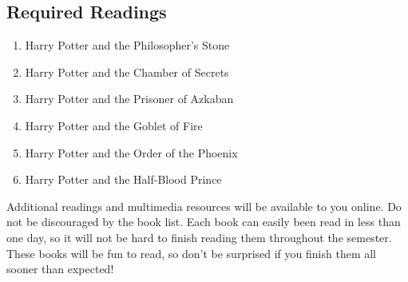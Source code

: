 \documentclass{article}
\begin{document}
\subsection {Required Readings}

\begin{enumerate}
\item Harry Potter and the Philosopher’s Stone
\item Harry Potter and the Chamber of Secrets
\item Harry Potter and the Prisoner of Azkaban
\item Harry Potter and the Goblet of Fire
\item Harry Potter and the Order of the Phoenix
\item Harry Potter and the Half-Blood Prince
\end{enumerate}

Additional readings and multimedia resources will be available to you online.
Do not be discouraged by the book list. Each book can easily been read in less than one day, so it will not be hard to finish reading them throughout the semester. These books will be fun to read, so don’t be surprised if you finish them all sooner than expected!
\end{document}
